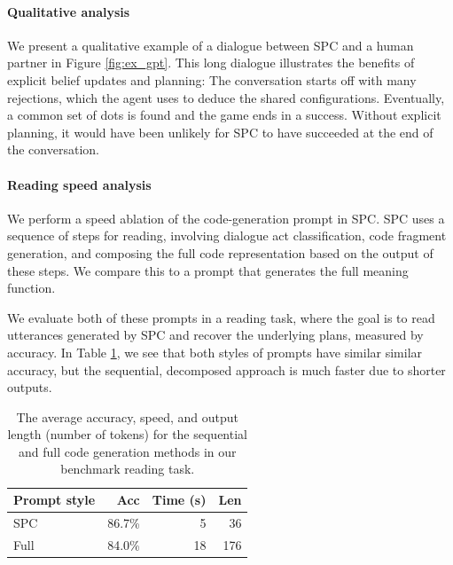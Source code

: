 \documentclass[11pt]{article}
\newcommand{\system}{SPC}
\begin{document}
\paragraph{Qualitative analysis}
We present a qualitative example of a dialogue between \system{} and a human partner in Figure \ref{fig:ex_gpt}.
This long dialogue illustrates the benefits of explicit belief updates and planning:
The conversation starts off with many rejections, which the agent uses to deduce the shared configurations.
Eventually, a common set of dots is found and the game ends in a success.
Without explicit planning, it would have been unlikely for \system{} to have  succeeded at the end of the conversation.

\paragraph{Reading speed analysis}
We perform a speed ablation of the code-generation prompt in \system{}.
\system{} uses a sequence of steps for reading,
involving dialogue act classification, code fragment generation,
and composing the full code representation based on the output of these steps.
We compare this to a prompt that generates the full meaning function.

We evaluate both of these prompts in a reading task,
where the goal is to read utterances generated by \system{} and recover the underlying plans, measured by accuracy.
In Table \ref{tbl:prompt}, we see that both styles of prompts have similar similar accuracy, but the sequential, decomposed approach is much faster due to shorter outputs.

\begin{table}[!t]
\centering
\begin{tabular}{lrrr}
\toprule
Prompt style                   & Acc     & Time (s) & Len\\
\midrule
\system{}                      & 86.7\%  & 5     &  36\\
Full                           & 84.0\%  & 18    &  176\\
\bottomrule
\end{tabular}
\caption{\label{tbl:prompt}
The average accuracy, speed, and output length (number of tokens) for the sequential and full code generation methods in our benchmark reading task.
\vspace{-1.3em}
}
\end{table}
\end{document}
